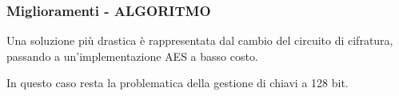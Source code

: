 \begin{frame}
    \frametitle{Miglioramenti - ALGORITMO}
    Una soluzione più drastica è rappresentata dal cambio del circuito di cifratura, passando a un'implementazione AES a basso costo.\cite{feldhofer2005aes}

    In questo caso resta la problematica della gestione di chiavi a 128 bit.
\end{frame}